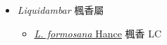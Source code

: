 
  \begin{itemize}
 \item[] \textit{Liquidambar} 楓香屬
                    
  \begin{itemize}
        \item[] \href{http://www.theplantlist.org/tpl1.1/search?q=Liquidambar+formosana}{\textit{L. formosana} Hance}   楓香 LC
  \end{itemize}
  \end{itemize}
